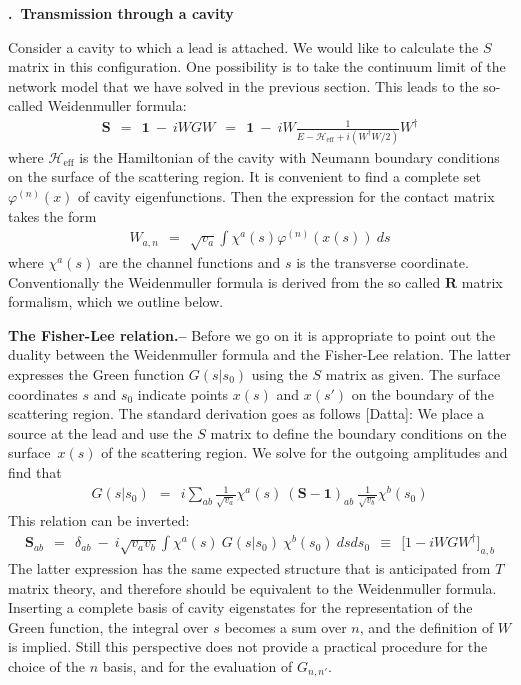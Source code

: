 \documentclass[onecolumn,fleqn, 11pt]{revtex4}
\newcommand{\beq}{\begin{eqnarray}}
\newcommand{\eeq}{\end{eqnarray}}
\renewcommand{\thesubsection}{\arabic{subsection}}
\renewcommand{\thesubsubsection}{\arabic{subsubsection}}
\newcommand{\sheadC}[1]
{
\addtocounter{subsubsection}{1}
\vspace{5mm}
{\bf \thesubsection.\thesubsubsection \ #1}  
\nopagebreak
\phantomsection
}
\begin{document}
\sheadC{Transmission through a cavity}


Consider a cavity to which a lead is attached.
We would like to calculate the $S$ matrix in this configuration.  
One possibility is to take the continuum limit 
of the network model that we have solved in the
previous section. This leads to the so-called Weidenmuller formula:
\beq
\bm{S} 
\ \  = \ \ \bm{1} \ - \ iWGW 
\ \  = \ \ \bm{1} \ - \ i W \frac{1}{E-\mathcal{H}_{\text{eff}}+i(W^{\dag}W/2)} W^{\dag} 
\eeq
where $\mathcal{H}_{\text{eff}}$ is the Hamiltonian 
of the cavity with Neumann boundary conditions on the 
surface of the scattering region. It is convenient
to find a complete set $\varphi^{(n)}(x)$ 
of cavity eigenfunctions. Then the expression for 
the contact matrix takes the form 
\beq
W_{a,n} \ \ = \ \ \sqrt{v_a} \int  \chi^a(s) \varphi^{(n)}(x(s)) \ ds
\eeq
where $\chi^a(s)$ are the channel functions 
and $s$ is the transverse coordinate.
Conventionally the Weidenmuller formula is  
derived from the so called $\bm{R}$ matrix 
formalism, which we outline below. 


{\bf The Fisher-Lee relation.-- } 
Before we go on it is appropriate to point out 
the duality between the Weidenmuller formula
and the Fisher-Lee relation. 
The latter expresses the Green function $G(s|s_0)$
using the $S$ matrix as given. 
The surface coordinates $s$ and $s_0$ indicate 
points $x(s)$ and $x(s')$ on the boundary 
of the scattering region.  
 The standard derivation goes as follows [Datta]: 
We place a source at the lead and use the $S$ matrix 
to define the boundary conditions on the surface~$x(s)$  
of the scattering region. We solve for the outgoing 
amplitudes and find that 
\beq
G(s|s_0) \ \ = \ \  i\sum_{ab} 
\frac{1}{\sqrt{v_a}}\chi^a(s) 
\ (\bm{S}-\bm{1})_{ab} \  
\frac{1}{\sqrt{v_b}}\chi^b(s_0)      
\eeq
This relation can be inverted:
\beq
\bm{S}_{ab} 
\ \ = \ \ \delta_{ab} 
\ - \ i \sqrt{v_a v_b} 
\int \chi^a(s) \ G(s|s_0) \ \chi^b(s_0) 
\ ds ds_0
\ \ \equiv \ \ 
\Big[ 1 - iWGW^{\dag} \Big]_{a,b}  
\eeq
The latter expression has the same expected structure 
that is anticipated from $T$ matrix theory, 
and therefore should be equivalent to the Weidenmuller formula. 
Inserting a complete basis of cavity eigenstates for 
the representation of the Green function, 
the integral over $s$ becomes a sum over $n$,
and the definition of $W$ is implied. 
Still this perspective does not provide a practical 
procedure for the choice of the $n$ basis, 
and for the evaluation of $G_{n,n'}$. 
\end{document}
